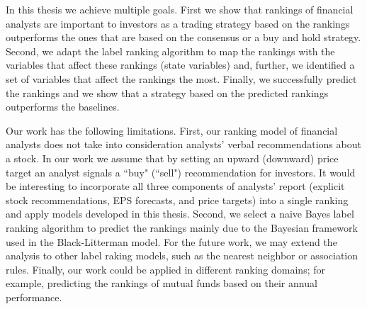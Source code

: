 In this thesis we achieve multiple goals. First we show that rankings of financial analysts are important to investors as a trading strategy based on the rankings outperforms the ones that are based on the consensus or a buy and hold strategy. Second, we adapt the label ranking algorithm to map the rankings with the variables that affect these rankings (state variables) and, further, we identified a set of variables that affect the rankings the most. Finally, we successfully predict the rankings and we show that a strategy based on the predicted rankings outperforms the baselines. 

Our work has the following limitations. First, our ranking model of financial analysts does not take into consideration analysts' verbal recommendations about a stock. In our work we assume that by setting an upward (downward) price target an analyst signals a ``buy" (``sell") recommendation for investors. It would be interesting to incorporate all three components of analysts' report (explicit stock recommendations, EPS forecasts, and price targets)  into a single ranking and apply models developed in this thesis.  Second, we select a naive Bayes label ranking algorithm to predict the rankings mainly due to the Bayesian framework used in  the Black-Litterman model. For the future work, we may extend the analysis to other label raking models, such as the nearest neighbor or association rules. Finally, our work could be applied in different ranking domains; for example, predicting the rankings of mutual funds based on their annual performance. 

